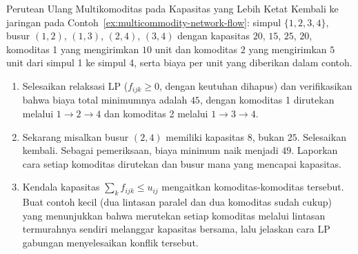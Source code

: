 
\begin{ex}{Perutean Ulang Multikomoditas pada Kapasitas yang Lebih Ketat}{}
\label{ex:multicommodity-rerouting}
 Kembali ke jaringan pada Contoh~\ref{ex:multicommodity-network-flow}: simpul $\{1,2,3,4\}$, busur $(1,2)$, $(1,3)$, $(2,4)$, $(3,4)$ dengan kapasitas $20$, $15$, $25$, $20$, komoditas 1 yang mengirimkan $10$ unit dan komoditas 2 yang mengirimkan $5$ unit dari simpul 1 ke simpul 4, serta biaya per unit yang diberikan dalam contoh.
\begin{enumerate}
\item Selesaikan relaksasi LP ($f_{ijk} \geq 0$, dengan keutuhan dihapus) dan verifikasikan bahwa biaya total minimumnya adalah $45$, dengan komoditas 1 dirutekan melalui $1 \to 2 \to 4$ dan komoditas 2 melalui $1 \to 3 \to 4$.
\item Sekarang misalkan busur $(2,4)$ memiliki kapasitas $8$, bukan $25$. Selesaikan kembali. Sebagai pemeriksaan, biaya minimum naik menjadi $49$. Laporkan cara setiap komoditas dirutekan dan busur mana yang mencapai kapasitas.
\item Kendala kapasitas $\sum_k f_{ijk} \leq u_{ij}$ mengaitkan komoditas-komoditas tersebut. Buat contoh kecil (dua lintasan paralel dan dua komoditas sudah cukup) yang menunjukkan bahwa merutekan setiap komoditas melalui lintasan termurahnya sendiri melanggar kapasitas bersama, lalu jelaskan cara LP gabungan menyelesaikan konflik tersebut.
\end{enumerate}
\end{ex}

